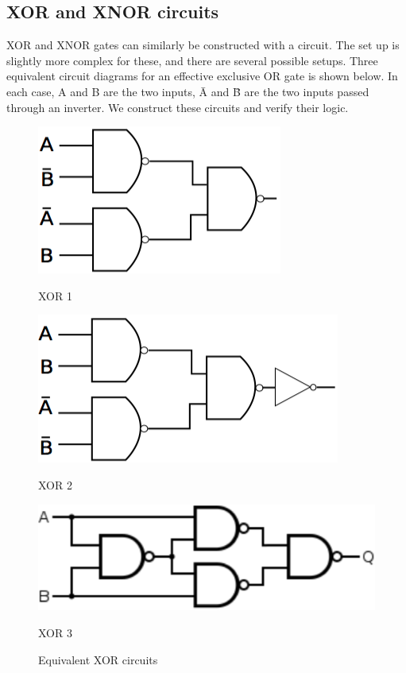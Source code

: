 \documentclass{article}
\begin{document}
\subsection*{XOR and XNOR circuits}
XOR and XNOR gates can similarly be constructed with a circuit. The set up is slightly more complex for these, and there are several possible setups. Three equivalent circuit diagrams for an effective exclusive OR gate is shown below. In each case, A and B are the two inputs, \=A and \=B are the two inputs passed through an inverter. We construct these circuits and verify their logic.

\begin{figure}[h]
\centering
\begin{minipage}[t]{0.23\textwidth}
\includegraphics[width=\textwidth]{XOR1.png}
\caption*{XOR 1}
\end{minipage}
\begin{minipage}[t]{0.29\textwidth}
\includegraphics[width=\textwidth]{XOR2.png}
\caption*{XOR 2}
\end{minipage}
\begin{minipage}[t]{0.35\textwidth}
\includegraphics[width=\textwidth]{XOR3.png}
\caption*{XOR 3}
\end{minipage}
\caption{Equivalent XOR circuits}
\label{fig:4}   
\end{figure}
\end{document}
